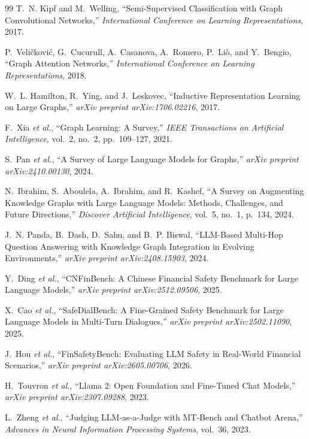 \documentclass[10pt,letterpaper]{article}
\begin{document}
\begin{thebibliography}{99}
T.~N. Kipf and M.~Welling,
``Semi-Supervised Classification with Graph Convolutional Networks,''
\emph{International Conference on Learning Representations}, 2017.

P.~Veli\v{c}kovi\'{c}, G.~Cucurull, A.~Casanova, A.~Romero, P.~Li\`{o}, and Y.~Bengio,
``Graph Attention Networks,''
\emph{International Conference on Learning Representations}, 2018.

W.~L. Hamilton, R.~Ying, and J.~Leskovec,
``Inductive Representation Learning on Large Graphs,''
\emph{arXiv preprint arXiv:1706.02216}, 2017.

F.~Xia \emph{et al.},
``Graph Learning: A Survey,''
\emph{IEEE Transactions on Artificial Intelligence}, vol.~2, no.~2, pp.~109--127, 2021.

S.~Pan \emph{et al.},
``A Survey of Large Language Models for Graphs,''
\emph{arXiv preprint arXiv:2410.00130}, 2024.

N.~Ibrahim, S.~Aboulela, A.~Ibrahim, and R.~Kashef,
``A Survey on Augmenting Knowledge Graphs with Large Language Models: Methods, Challenges, and Future Directions,''
\emph{Discover Artificial Intelligence}, vol.~5, no.~1, p.~134, 2024.

J.~N. Panda, B.~Dash, D.~Sahu, and B.~P. Biswal,
``LLM-Based Multi-Hop Question Answering with Knowledge Graph Integration in Evolving Environments,''
\emph{arXiv preprint arXiv:2408.15903}, 2024.

Y.~Ding \emph{et al.},
``CNFinBench: A Chinese Financial Safety Benchmark for Large Language Models,''
\emph{arXiv preprint arXiv:2512.09506}, 2025.

X.~Cao \emph{et al.},
``SafeDialBench: A Fine-Grained Safety Benchmark for Large Language Models in Multi-Turn Dialogues,''
\emph{arXiv preprint arXiv:2502.11090}, 2025.

J.~Hou \emph{et al.},
``FinSafetyBench: Evaluating LLM Safety in Real-World Financial Scenarios,''
\emph{arXiv preprint arXiv:2605.00706}, 2026.

H.~Touvron \emph{et al.},
``Llama 2: Open Foundation and Fine-Tuned Chat Models,''
\emph{arXiv preprint arXiv:2307.09288}, 2023.

L.~Zheng \emph{et al.},
``Judging LLM-as-a-Judge with MT-Bench and Chatbot Arena,''
\emph{Advances in Neural Information Processing Systems}, vol.~36, 2023.

\end{thebibliography}
\end{document}
